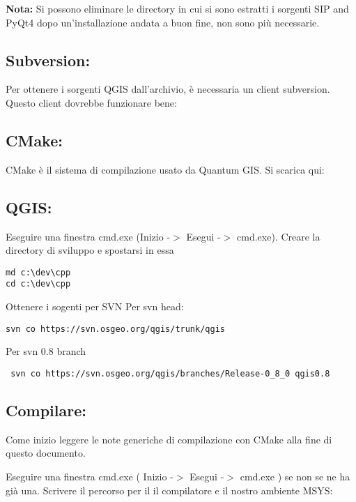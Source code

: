 \textbf{Nota:} Si possono eliminare le directory in cui si sono estratti i sorgenti SIP and PyQt4 dopo un'installazione andata a buon fine, non sono più necessarie.

\subsection{Subversion:}
Per ottenere i sorgenti QGIS dall'archivio, è necessaria un client subversion. Questo client dovrebbe funzionare bene:


\subsection{CMake:}
CMake è il sistema di compilazione usato da Quantum GIS. Si scarica qui:


\subsection{QGIS:}
Eseguire una finestra cmd.exe (Inizio -$>$ Esegui -$>$ cmd.exe). Creare la directory di sviluppo e spostarsi in essa

\begin{verbatim}
md c:\dev\cpp 
cd c:\dev\cpp 
\end{verbatim}

Ottenere i sogenti per SVN 
Per svn head:

\begin{verbatim}
svn co https://svn.osgeo.org/qgis/trunk/qgis 
\end{verbatim}
Per svn 0.8 branch

\begin{verbatim}
 svn co https://svn.osgeo.org/qgis/branches/Release-0_8_0 qgis0.8
\end{verbatim}

\subsection{Compilare:}
Come inizio leggere le note generiche di compilazione con CMake alla fine di questo documento.

Eseguire una finestra cmd.exe ( Inizio -$>$ Esegui -$>$ cmd.exe ) se non se ne ha già una. Scrivere il percorso per il il compilatore e il nostro ambiente MSYS:

